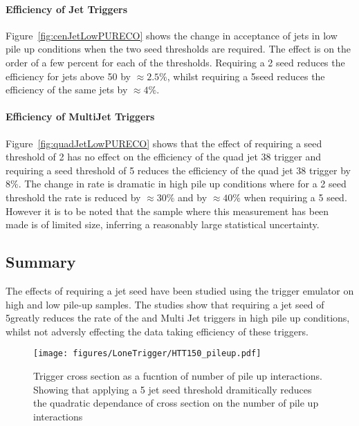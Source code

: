 \paragraph{Efficiency of Jet Triggers} %
\label{par:Efficiency of Jet Triggers}
Figure~\ref{fig:cenJetLowPURECO} shows the change in acceptance of jets in low 
pile up conditions when the two seed thresholds are required. The effect is on 
the order of a few percent for each of the thresholds. Requiring a 2 \GeV seed 
reduces the efficiency for jets above 50 \GeV by $\approx 2.5\%$, whilst 
requiring a 5\GeV seed reduces the efficiency of the same jets by $\approx 4\%$.

\paragraph{Efficiency of MultiJet Triggers} %
\label{par:Efficiency of MultiJet Triggers}
Figure~\ref{fig:quadJetLowPURECO} shows that the effect of requiring a seed 
threshold of 2 \GeV has no effect on the efficiency of the quad jet 38 \GeV 
trigger and requiring a seed threshold of 5 \GeV reduces the efficiency of the 
quad jet 38 trigger by $8\%$. The change in rate is dramatic in high pile up 
conditions where for a 2 \GeV seed threshold the rate is reduced by 
$\approx 30\%$ and by $\approx 40\%$ when requiring a 5 \GeV seed.
However it is to be noted that the sample where this measurement has been made 
is of limited size, inferring a reasonably large statistical uncertainty. 




\subsection{Summary} %
\label{sec:Summary}
The effects of requiring a jet seed have been studied using the \Lone trigger 
emulator on high and low pile-up samples. The studies show that requiring a jet 
seed of 5\GeV greatly reduces the rate of the \HT and Multi Jet triggers in 
high pile up conditions, whilst not adversly effecting the data taking 
efficiency of these triggers.

\begin{figure}[ht]
  \centering
    \texttt{[image: figures/LoneTrigger/HTT150\_pileup.pdf]}
  \caption{Trigger cross section as a fucntion of number of pile up 
  interactions. Showing that applying a 5 \GeV jet seed threshold dramitically 
  reduces the quadratic dependance of cross section on the number of pile up 
  interactions}
  \label{fig:figures_HTT150_pileup}
\end{figure}

